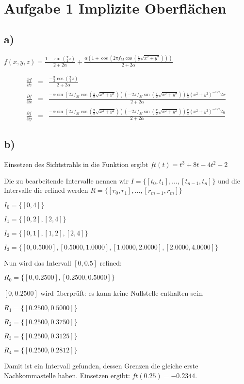 
\section*{Aufgabe 1 Implizite Oberflächen}
\subsection*{a)}
$f(x,y,z) = \frac{1-\sin(\frac{\pi}{2}z)}{2 + 2\alpha} + \frac{\alpha (1 + \cos(2\pi f_M \cos(\frac{\pi}{2} \sqrt{x^2+y^2})))}{2 + 2\alpha}$

\begin{eqnarray}
    \frac{\partial f}{\partial z}&=& \frac{-\frac{\pi}{2}\cos(\frac{\pi}{2}z)}{2 + 2\alpha} \\
    \frac{\partial f}{\partial x}&=&  \frac{-\alpha \sin(2\pi f_M \cos(\frac{\pi}{2} \sqrt{x^2+y^2})) (-2\pi f_M\sin(\frac{\pi}{2}\sqrt{x^2+y^2})) \frac{\pi}{4} (x^2+y^2)^{-1/2} 2x}
    {2 + 2\alpha}\\
    \frac{\partial f}{\partial y}&=&\frac{-\alpha \sin(2\pi f_M \cos(\frac{\pi}{2} \sqrt{x^2+y^2})) (-2\pi f_M\sin(\frac{\pi}{2}\sqrt{x^2+y^2})) \frac{\pi}{4} (x^2+y^2)^{-1/2} 2y}
    {2 + 2\alpha}
\end{eqnarray}

\subsection*{b)}

Einsetzen des Sichtstrahls in die Funktion ergibt $ft(t) = t^3+8t-4t^2-2$

Die zu bearbeitende Intervalle nennen wir $I = \{[t_0, t_1],\dots, [t_{n-1}, t_{n}] \}$ und die Intervalle die refined werden $R = \{[r_0, r_1],\dots, [r_{m-1}, r_{m}] \}$

$I_0 = \{[ 0 ,4 ]\}$

$I_1 = \{[0,2],
     [2    ,4 ]\}$

$I_2 = \{[ 0, 1],
     [1   , 2],
     [2   ,  4 ]\}$


$I_3 = \{[ 0  ,  0.5000],
    [0.5000  ,  1.0000],
    [1.0000  ,  2.0000],
    [2.0000  ,  4.0000 ]\}$

\hspace{1.0cm}

Nun wird das Intervall $[0, 0.5]$ refined:

$R_0 = \{[ 0 , 0.2500 ],
    [0.2500  ,0.5000 ] \}$
    

$[ 0 , 0.2500 ]$ wird überprüft: es kann keine Nullstelle enthalten sein.

$R_1 = \{[0.2500, 0.5000] \}$

$R_2 = \{[0.2500, 0.3750] \}$

$R_3 = \{[0.2500,0.3125] \}$

$R_4 = \{[0.2500, 0.2812] \}$

Damit ist ein Intervall gefunden, dessen Grenzen die gleiche erste Nachkommastelle haben. Einsetzen ergibt: $ft(0.25) = -0.2344$.


